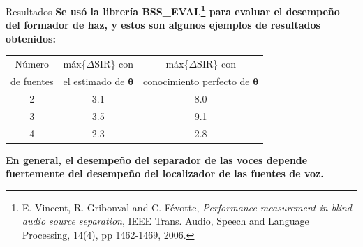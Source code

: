 \documentclass[12pt,aspectratio=169]{beamer}
\begin{document}
	\begin{frame}{Resultados}
		\textbf{Se usó la librería BSS\_EVAL\footnote{E. Vincent, R. Gribonval and C. Févotte, \textit{Performance measurement in blind audio source separation}, IEEE Trans. Audio, Speech and Language Processing, 14(4), pp 1462-1469, 2006.} para evaluar el desempeño del formador de haz, y estos son algunos ejemplos de resultados obtenidos:}
		\begin{table}[H]
			\begin{center}
				\begin{tabular}{|c||c|c|}
					\hline Número & máx\{$\Delta$SIR\} con & máx\{$\Delta$SIR\} con \\ 
					de fuentes & el estimado de $\pmb{\theta}$ & conocimiento perfecto de $\pmb{\theta}$ \\ 
					\hline \hline 
					2 & 3.1 & 8.0  \\
					\hline 									 			
					3 & 3.5 & 9.1 \\
					\hline 									 			
					4 & 2.3 & 2.8  \\
					\hline 							
				\end{tabular}
			\end{center}
		\end{table}
		\vspace{-3mm}
		\pause
		\color{red} \textbf{En general, el desempeño del separador de las voces depende fuertemente del desempeño del localizador de las fuentes de voz.}
	\end{frame}
	
%	
	
\end{document}
